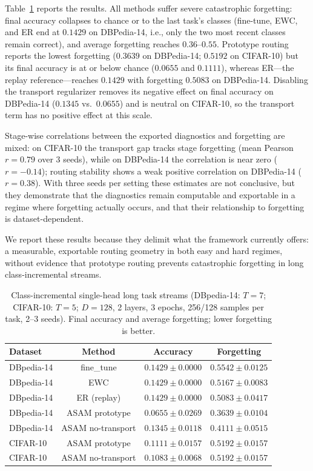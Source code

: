 \documentclass[11pt,a4paper]{article}
\theoremstyle{definition}
\begin{document}
Table~\ref{tab:longstream} reports the results. All methods suffer severe catastrophic forgetting: final accuracy collapses to chance or to the last task's classes (fine-tune, EWC, and ER end at $0.1429$ on DBPedia-14, i.e., only the two most recent classes remain correct), and average forgetting reaches $0.36$--$0.55$. Prototype routing reports the lowest forgetting ($0.3639$ on DBPedia-14; $0.5192$ on CIFAR-10) but its final accuracy is at or below chance ($0.0655$ and $0.1111$), whereas ER---the replay reference---reaches $0.1429$ with forgetting $0.5083$ on DBPedia-14. Disabling the transport regularizer removes its negative effect on final accuracy on DBPedia-14 ($0.1345$ vs.\ $0.0655$) and is neutral on CIFAR-10, so the transport term has no positive effect at this scale.

Stage-wise correlations between the exported diagnostics and forgetting are mixed: on CIFAR-10 the transport gap tracks stage forgetting (mean Pearson $r = 0.79$ over 3 seeds), while on DBPedia-14 the correlation is near zero ($r = -0.14$); routing stability shows a weak positive correlation on DBPedia-14 ($r = 0.38$). With three seeds per setting these estimates are not conclusive, but they demonstrate that the diagnostics remain computable and exportable in a regime where forgetting actually occurs, and that their relationship to forgetting is dataset-dependent.

We report these results because they delimit what the framework currently offers: a measurable, exportable routing geometry in both easy and hard regimes, without evidence that prototype routing prevents catastrophic forgetting in long class-incremental streams.

\begin{table}[t]
\centering
\caption{Class-incremental single-head long task streams (DBpedia-14: $T=7$; CIFAR-10: $T=5$; $D=128$, 2 layers, 3 epochs, 256/128 samples per task, 2--3 seeds). Final accuracy and average forgetting; lower forgetting is better.}
\label{tab:longstream}
\begin{tabular}{lccc}
\toprule
\textbf{Dataset} & \textbf{Method} & \textbf{Accuracy} & \textbf{Forgetting} \\
\midrule
DBpedia-14 & fine\_tune & $0.1429 \pm 0.0000$ & $0.5542 \pm 0.0125$ \\
DBpedia-14 & EWC & $0.1429 \pm 0.0000$ & $0.5167 \pm 0.0083$ \\
DBpedia-14 & ER (replay) & $0.1429 \pm 0.0000$ & $0.5083 \pm 0.0417$ \\
DBpedia-14 & ASAM prototype & $0.0655 \pm 0.0269$ & $0.3639 \pm 0.0104$ \\
DBpedia-14 & ASAM no-transport & $0.1345 \pm 0.0118$ & $0.4111 \pm 0.0515$ \\
CIFAR-10 & ASAM prototype & $0.1111 \pm 0.0157$ & $0.5192 \pm 0.0157$ \\
CIFAR-10 & ASAM no-transport & $0.1083 \pm 0.0068$ & $0.5192 \pm 0.0157$ \\
\bottomrule
\end{tabular}
\end{table}
\end{document}
